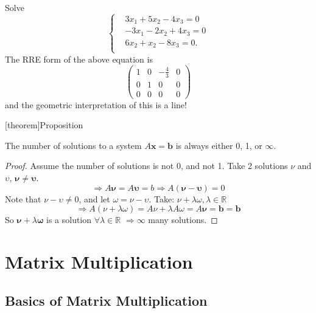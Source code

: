 \documentclass[12pt]{report}
\theoremstyle{definition}
\begin{document}
\begin{ex}
    Solve\[
        \left\{
            \begin{align*}
                & 3x_1 + 5x_2 - 4x_3 = 0 \\
                & -3x_1 - 2x_2 + 4x_3 = 0 \\
                & 6x_2 + x_2 - 8x_3 = 0. \\
            \end{align*}
            \right.
    \]
    The RRE form of the above equation is\[
        \begin{pmatrix}
            1 & 0 & -\frac{4}{3} & 0 \\
            0 & 1 & 0 & 0 \\
            0 & 0 & 0 & 0
        \end{pmatrix} 
    \]
    and the geometric interpretation of this is a line!
\end{ex}

[theorem]{Proposition}
\begin{Solutions to a system is 0, 1, infinity}
    The number of solutions to a system $A\mathbf{x} = \mathbf{b}$ is always either 0, 1, or $\infty$.
\end{Solutions to a system is 0, 1, infinity}

\begin{proof}
    Assume the number of solutions is not 0, and not 1.
    Take 2 solutions $\nu$ and $\upsilon$, $\mathbf{\nu} \neq \mathbf{\upsilon}$.\[
        \Rightarrow{} A\mathbf{\nu} = A\mathbf{\upsilon} = b \Rightarrow{}
        A(\mathbf{\nu} - \mathbf{\upsilon}) = 0
    \]
    Note that $\nu-\upsilon \neq 0$,
    and let $\omega = \nu - \upsilon$.
    Take: $\nu + \lambda \omega, \lambda \in \mathbb{R}$\[
        \Rightarrow{} A(\nu + \lambda\omega) = A\nu + \lambda A\omega = A\mathbf{\nu} = \mathbf{b} = \mathbf{b}
    \]
    So $\mathbf{\nu} + \lambda \mathbf{\omega}$ is a solution $\forall \lambda \in \mathbb{R}$
    $\Rightarrow{} \infty$ many solutions.
\end{proof}

\section{Matrix Multiplication}

\subsection{Basics of Matrix Multiplication}
\end{document}
